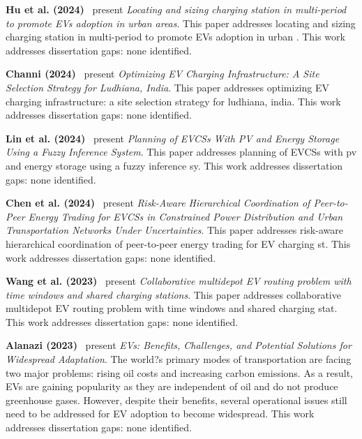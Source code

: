 \documentclass[letterpaper, 12pt, oneside, doublespacing]{Thesis}
\begin{document}
\noindent \textbf{Hu et al. (2024)}~\cite{locating_and_2024} present \textit{Locating and sizing charging station in multi-period to promote EVs adoption in urban areas}. This paper addresses locating and sizing charging station in multi-period to promote EVs adoption in urban . This work addresses dissertation gaps: none identified.



\noindent \textbf{Channi (2024)}~\cite{optimizing_electric_2024} present \textit{Optimizing EV Charging Infrastructure: A Site Selection Strategy for Ludhiana, India}. This paper addresses optimizing EV charging infrastructure: a site selection strategy for ludhiana, india. This work addresses dissertation gaps: none identified.



\noindent \textbf{Lin et al. (2024)}~\cite{planning_of_2024} present \textit{Planning of EVCSs With PV and Energy Storage Using a Fuzzy Inference System}. This paper addresses planning of EVCSs with pv and energy storage using a fuzzy inference sy. This work addresses dissertation gaps: none identified.



\noindent \textbf{Chen et al. (2024)}~\cite{risk-aware_hierarchical_2024} present \textit{Risk-Aware Hierarchical Coordination of Peer-to-Peer Energy Trading for EVCSs in Constrained Power Distribution and Urban Transportation Networks Under Uncertainties}. This paper addresses risk-aware hierarchical coordination of peer-to-peer energy trading for EV charging st. This work addresses dissertation gaps: none identified.



\noindent \textbf{Wang et al. (2023)}~\cite{joint_planning_2023} present \textit{Collaborative multidepot EV routing problem with time windows and shared charging stations}. This paper addresses collaborative multidepot EV routing problem with time windows and shared charging stat. This work addresses dissertation gaps: none identified.



\noindent \textbf{Alanazi (2023)}~\cite{electric_vehicles_2023} present \textit{EVs: Benefits, Challenges, and Potential Solutions for Widespread Adaptation}. The world?s primary modes of transportation are facing two major problems: rising oil costs and increasing carbon emissions. As a result, EVs are gaining popularity as they are independent of oil and do not produce greenhouse gases. However, despite their benefits, several operational issues still need to be addressed for EV adoption to become widespread. This work addresses dissertation gaps: none identified.
\end{document}
